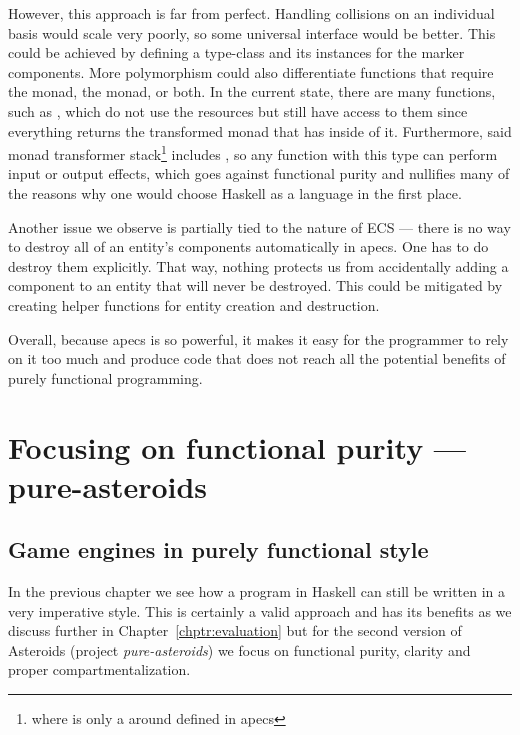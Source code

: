 \documentclass[
  digital, %
  color,   %
  table,   %
  oneside, %
  lof,     %
  lot,     %
]{fithesis3}
\begin{document}
However, this approach is far from perfect. Handling collisions on an
individual basis would scale very poorly, so some universal interface would be better.
This could be achieved by defining a type-class and its instances for the marker components.
More polymorphism could also differentiate functions that require the
 monad, the  monad, or both.
In the current state, there are many functions, such as ,
which do not use the resources but still have access to them since
everything returns the transformed  monad
that has  inside of it. Furthermore,
said monad transformer stack\footnote{
where  is only a 
around  defined in apecs
}
includes , so any function with this type can perform
input or output effects, which goes against functional purity and nullifies
many of the reasons why one would choose Haskell as a language in the first place.

Another issue we observe is partially tied to the nature of ECS --- there
is no way to destroy all of an entity's components automatically in apecs.
One has to do destroy them explicitly. That way, nothing protects us
from accidentally adding a component to an entity that will never be destroyed.
This could be mitigated by creating helper functions for entity creation and destruction.

Overall, because apecs is so powerful, it makes it easy for the programmer to rely
on it too much and produce code that does not reach all the potential
benefits of purely functional programming.




\chapter{Focusing on functional purity --- pure-asteroids}
\label{chptr:purity}

\section{Game engines in purely functional style}
\label{sect:pureengines}

In the previous chapter we see how a program in Haskell can still be
written in a very imperative style. 
This is certainly a valid approach and has its benefits as we discuss
further in Chapter~\ref{chptr:evaluation} but for the second version of
Asteroids (project \emph{pure-asteroids}) we focus on functional purity,
clarity and proper compartmentalization.
\end{document}
